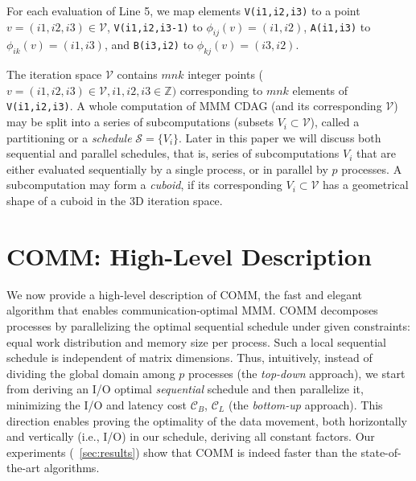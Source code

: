 \documentclass[sigplan,review,anonymous]{acmart}\settopmatter{printfolios=true,printccs=false,printacmref=false}
\newcommand\mac[1]{\textcolor{red}{[Mac: #1]}}
\begin{document}
 For each 
evaluation of 
Line 5, we map elements \texttt{V(i1,i2,i3)} to a point $v = (i1,i2,i3) \in 
\mathcal{V}$, \texttt{V(i1,i2,i3-1)} to $\phi_{ij}(v) = (i1,i2)$,
\texttt{A(i1,i3)} to $\phi_{ik}(v) = (i1,i3)$,
and \texttt{B(i3,i2)} to $\phi_{kj}(v) = (i3,i2)$.

The iteration space $\mathcal{V}$ contains $mnk$ integer points ($v = 
(i1,i2,i3) \in \mathcal{V}, i1,i2,i3 \in \mathbb{Z})$ corresponding to $mnk$ 
 elements of \texttt{V(i1,i2,i3)}. 
 A whole computation of MMM CDAG (and its corresponding  $\mathcal{V}$) may be 
 split into a series of subcomputations (subsets $V_i \subset \mathcal{V}$), 
 called a partitioning or a \emph{schedule} $\mathcal{S} = \{V_i\}$. Later 
 in this paper we will discuss both sequential and parallel schedules, that is, 
 series of subcomputations $V_i$ that are either evaluated sequentially by a 
 single process, or in parallel by $p$ processes. A subcomputation may form a 
 \emph{cuboid}, if its corresponding $V_i \subset \mathcal{V}$ has a 
 geometrical shape of a cuboid in the 3D iteration space.


\section{COMM: High-Level Description}
%
%

We now provide a high-level description of COMM, the fast and elegant algorithm 
that
enables communication-optimal MMM.
COMM  decomposes processes by
parallelizing the optimal sequential schedule under given constraints: equal
work distribution and memory size per process. Such
a local sequential schedule is independent of matrix dimensions.
Thus, intuitively, instead of dividing  the global
domain among $p$ processes (the \emph{top-down} approach), we start from 
deriving an I/O optimal \emph{sequential} schedule and
then parallelize it, minimizing the I/O and latency cost $\mathcal{C}_B$,
$\mathcal{C}_L$ (the \emph{bottom-up} approach). This direction enables proving 
the optimality of the data movement, both
horizontally and vertically (i.e., I/O) in our
schedule, deriving all constant factors. Our experiments (~\cref{sec:results}) 
show that COMM is indeed faster than the
state-of-the-art algorithms.
\end{document}
